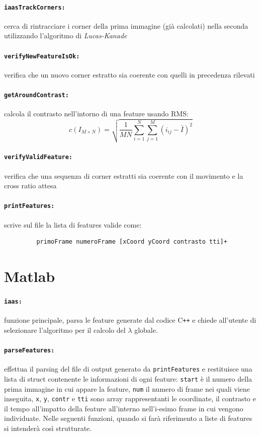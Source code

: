 \documentclass[12pt]{report}
\begin{document}
\paragraph*{\verb_iaasTrackCorners:_} cerca di rintracciare i corner della prima immagine (gi\`a calcolati) nella seconda utilizzando l'algoritmo di \emph{Lucas-Kanade}

\paragraph*{\verb_verifyNewFeatureIsOk:_} verifica che un nuovo corner estratto sia coerente con quelli in precedenza rilevati

\paragraph*{\verb_getAroundContrast:_} calcola il contrasto nell'intorno di una feature usando RMS: $$ c\left(I_{M\times N}\right) = \sqrt{\frac{1}{MN}\sum_{i=1}^N\sum_{j=1}^M(i_{ij}-\bar{I})^2} $$

\paragraph*{\verb_verifyValidFeature:_} verifica che una sequenza di corner estratti sia coerente con il movimento e la cross ratio attesa

\paragraph*{\verb_printFeatures:_} scrive sul file la lista di features valide come:
\begin{verbatim}
	     primoFrame numeroFrame [xCoord yCoord contrasto tti]+
\end{verbatim}



\section{Matlab}

\paragraph*{\verb_iaas:_} funzione principale, parsa le feature generate dal codice C\verb|++| e chiede all'utente di selezionare l'algoritmo per il calcolo del $\lambda$ globale.

\paragraph*{\verb_parseFeatures:_} effettua il parsing del file di output generato da \verb|printFeatures| e restituisce una lista di struct contenente le informazioni di ogni feature: \verb|start| \`e il numero della prima immagine in cui appare la feature, \verb|num| il numero di frame nei quali viene inseguita, \verb|x|, \verb|y|, \verb|contr| e \verb|tti| sono array rappresentanti le coordinate, il contrasto e il tempo all'impatto della feature all'interno nell'i-esimo frame in cui vengono individuate. Nelle seguenti funzioni, quando si far\`a riferimento a liste di features si intender\`a cos\`i strutturate.
\end{document}
